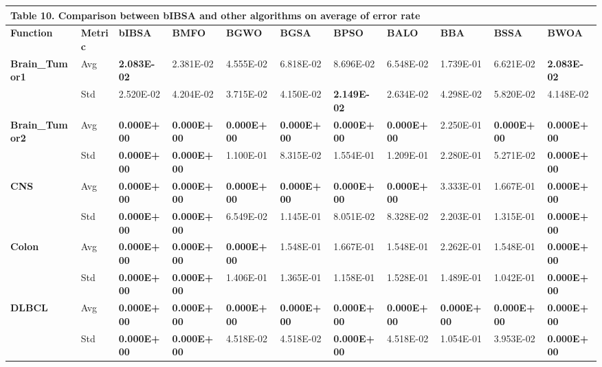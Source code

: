 \documentclass{article} %
\begin{document}
\begin{tabular}{|p{0.6in}|p{0.3in}|p{0.4in}|p{0.4in}|p{0.4in}|p{0.4in}|p{0.4in}|p{0.4in}|p{0.4in}|p{0.4in}|p{0.4in}|} \hline 
\multicolumn{10}{|p{1in}|}{\textbf{Table }10\textbf{. }Comparison between bIBSA and other algorithms on average of error rate\textbf{}} & \textbf{} \\ \hline 
\textbf{Function} & \textbf{Metric} & \textbf{bIBSA} & \textbf{BMFO} & \textbf{BGWO} & \textbf{BGSA} & \textbf{BPSO} & \textbf{BALO} & \textbf{BBA} & \textbf{BSSA} & \textbf{BWOA} \\ \hline 
\textbf{Brain\_Tumor1} & Avg & \textbf{2.083E-02} & 2.381E-02 & 4.555E-02 & 6.818E-02 & 8.696E-02 & 6.548E-02 & 1.739E-01 & 6.621E-02 & \textbf{2.083E-02} \\ \hline 
\textbf{} & Std & 2.520E-02\textbf{} & 4.204E-02 & 3.715E-02 & 4.150E-02 & \textbf{2.149E-02} & 2.634E-02 & 4.298E-02 & 5.820E-02 & 4.148E-02\textbf{} \\ \hline 
\textbf{Brain\_Tumor2} & Avg & \textbf{0.000E+00} & \textbf{0.000E+00} & \textbf{0.000E+00} & \textbf{0.000E+00} & \textbf{0.000E+00} & \textbf{0.000E+00} & 2.250E-01 & \textbf{0.000E+00} & \textbf{0.000E+00} \\ \hline 
\textbf{} & Std & \textbf{0.000E+00} & \textbf{0.000E+00} & 1.100E-01 & 8.315E-02 & 1.554E-01 & 1.209E-01 & 2.280E-01 & 5.271E-02 & \textbf{0.000E+00} \\ \hline 
\textbf{CNS} & Avg & \textbf{0.000E+00} & \textbf{0.000E+00} & \textbf{0.000E+00} & \textbf{0.000E+00} & \textbf{0.000E+00} & \textbf{0.000E+00} & 3.333E-01 & 1.667E-01 & \textbf{0.000E+00} \\ \hline 
\textbf{} & Std & \textbf{0.000E+00} & \textbf{0.000E+00} & 6.549E-02 & 1.145E-01 & 8.051E-02 & 8.328E-02 & 2.203E-01 & 1.315E-01 & \textbf{0.000E+00} \\ \hline 
\textbf{Colon} & Avg & \textbf{0.000E+00} & \textbf{0.000E+00} & \textbf{0.000E+00} & 1.548E-01 & 1.667E-01 & 1.548E-01 & 2.262E-01 & 1.548E-01 & \textbf{0.000E+00} \\ \hline 
\textbf{} & Std & \textbf{0.000E+00} & \textbf{0.000E+00} & 1.406E-01 & 1.365E-01 & 1.158E-01 & 1.528E-01 & 1.489E-01 & 1.042E-01 & \textbf{0.000E+00} \\ \hline 
\textbf{DLBCL} & Avg & \textbf{0.000E+00} & \textbf{0.000E+00} & \textbf{0.000E+00} & \textbf{0.000E+00} & \textbf{0.000E+00} & \textbf{0.000E+00} & \textbf{0.000E+00} & \textbf{0.000E+00} & \textbf{0.000E+00} \\ \hline 
\textbf{} & Std & \textbf{0.000E+00} & \textbf{0.000E+00} & 4.518E-02 & 4.518E-02 & \textbf{0.000E+00} & 4.518E-02 & 1.054E-01 & 3.953E-02 & \textbf{0.000E+00} \\ \hline 

\end{tabular}
\end{document}

